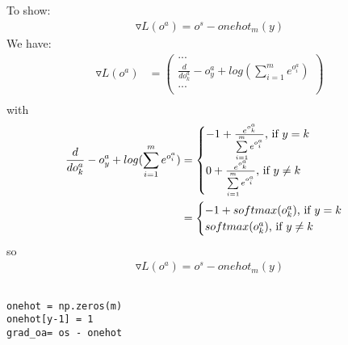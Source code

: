 \documentclass[12pt]{article}
\begin{document}
\subsection{}
To show:
\begin{align}
\label{grad_oa}
\triangledown L({o^a}) = o^s-onehot_m(y)
\end{align}
We have: 
\begin{align*}
\triangledown L({o^a}) & = \begin{pmatrix}
... \\
\frac{d}{do^a_k} -o^a_y+log(\sum\limits_{i=1}^m e^{o^a_i}) \\
... \\
\end{pmatrix} \\
\end{align*}
with
\begin{align*}
\frac{d}{do^a_k} -o^a_y+log(\sum\limits_{i=1}^m e^{o^a_i}) & = \begin{cases}
               -1+\frac{e^{o^a_k}}{\sum\limits_{i=1}^m e^{o^a_i}}$, if $ y = k \\
               0+\frac{e^{o^a_k}}{\sum\limits_{i=1}^m e^{o^a_i}}$, if $ y \neq k \\
            \end{cases} \\
            & = \begin{cases}
               -1+ softmax(o^a_k)$, if $ y = k \\
               softmax(o^a_k)$, if $ y \neq k \\
            \end{cases} \\
\end{align*}
so \begin{align*}
\triangledown L({o^a}) = o^s-onehot_m(y)
\end{align*}
\subsection{}
\begin{lstlisting}
onehot = np.zeros(m)
onehot[y-1] = 1
grad_oa= os - onehot
\end{lstlisting}
\end{document}
